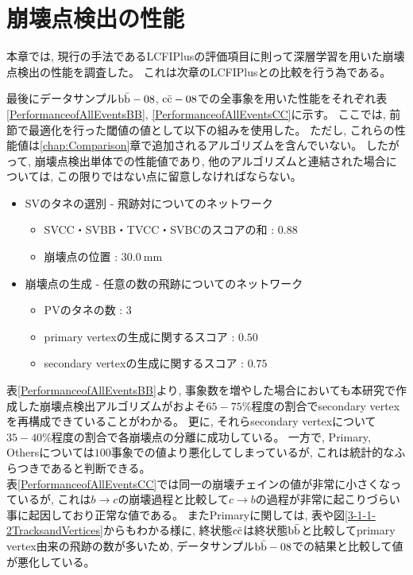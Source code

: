 \section{崩壊点検出の性能} \label{VFDL:SummaryofVFDL}

本章では, 現行の手法であるLCFIPlusの評価項目に則って深層学習を用いた崩壊点検出の性能を調査した。
これは次章のLCFIPlusとの比較を行う為である。

最後にデータサンプル$\rm b\bar{b}-08$, $\rm c\bar{c}-08$での全事象を用いた性能をそれぞれ表\ref{PerformanceofAllEventsBB}, \ref{PerformanceofAllEventsCC}に示す。
ここでは, 前節で最適化を行った閾値の値として以下の組みを使用した。
ただし, これらの性能値は\ref{chap:Comparison}章で追加されるアルゴリズムを含んでいない。
したがって, 崩壊点検出単体での性能値であり, 他のアルゴリズムと連結された場合については, この限りではない点に留意しなければならない。
\newpage
\begin{itemize}
 \item SVのタネの選別 - 飛跡対についてのネットワーク
 \begin{itemize}
   \item SVCC・SVBB・TVCC・SVBCのスコアの和 : $0.88$
   \item 崩壊点の位置 : $30.0\ {\mathrm{mm}}$
 \end{itemize}
 \item 崩壊点の生成 - 任意の数の飛跡についてのネットワーク
 \begin{itemize}
   \item PVのタネの数 : $3$
   \item primary vertexの生成に関するスコア : $0.50$
   \item secondary vertexの生成に関するスコア : $0.75$
 \end{itemize}
\end{itemize}

表\ref{PerformanceofAllEventsBB}より, 事象数を増やした場合においても本研究で作成した崩壊点検出アルゴリズムがおよそ$65 - 75\%$程度の割合でsecondary vertexを再構成できていることがわかる。
更に, それらsecondary vertexについて$35 - 40\%$程度の割合で各崩壊点の分離に成功している。
一方で, Primary, Othersについては$100$事象での値より悪化してしまっているが, これは統計的なふらつきであると判断できる。\\

表\ref{PerformanceofAllEventsCC}では同一の崩壊チェインの値が非常に小さくなっているが, これは$b \to c$の崩壊過程と比較して$c \to b$の過程が非常に起こりづらい事に起因しており正常な値である。
またPrimaryに関しては, 表や図\ref{3-1-1-2TracksandVertices}からもわかる様に, 終状態$\rm c\bar{c}$は終状態$\rm b\bar{b}$と比較してprimary vertex由来の飛跡の数が多いため, データサンプル$\rm b\bar{b}-08$での結果と比較して値が悪化している。

